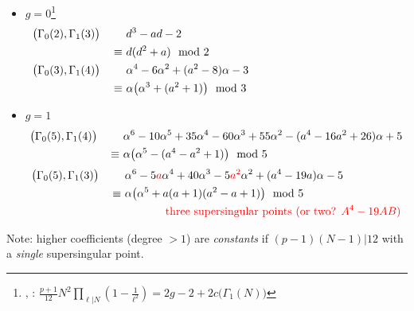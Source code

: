 \documentclass{rs}
\theoremstyle{definition}
\theoremstyle{remark}
\newcommand{\md}{~~{\rm mod}~}
\newcommand{\A}{\alpha}
\newcommand{\G}{\Gamma}
\renewcommand{\=}{\approx}
\renewcommand{\-}{\sim}
\newcommand{\rd}[1]{{\textcolor{red}{#1}}}
\numberwithin{equation}{section}
\begin{document}
\begin{itemize}
 \item $g = 0$\footnote{\cite[Theorem 10.13.12]{KM}, \cite[Section 3.8]{MF}: $\frac{p + 1}{12} N^2 \prod_{\ell | N} \left( 1 - \frac{1}{\ell^2} \right) = 2 g - 2 + 2 c\big(\G_1(N)\big)$} 
 \[
  \begin{split}
   \big(\G_0(2),\G_1(3)\big) \qquad & ~ d^3 - a d - 2 \hskip 6.9cm \\
                             \equiv & ~ d (d^2 + a) \md 2 \\
   \big(\G_0(3),\G_1(4)\big) \qquad & ~ \A^4 - 6 \A^2 + (a^2 - 8) \A - 3 \\
                             \equiv & ~ \A \big(\A^3 + (a^2 + 1)\big) \md 3 
  \end{split}
 \]

 \item $g = 1$ 
 \begin{equation}
  \label{w5}
  \begin{split}
   \big(\G_0(5),\G_1(4)\big) \qquad & ~ \A^6 - 10 \A^5 + 35 \A^4 - 60 \A^3 + 55 \A^2 - (a^4 - 16 a^2 + 26) \A + 5 \\
                             \equiv & ~ \A \big(\A^5 - (a^4 - a^2 + 1)\big) \md 5 
  \end{split}
 \end{equation}
 \[
  \begin{split}
   \big(\G_0(5),\G_1(3)\big) \qquad & ~ \A^6 - 5 \rd{a} \A^4 + 40 \A^3 - 5 \rd{a^2} \A^2 + (a^4 - 19 a) \A - 5 \hskip 1.4cm \\
                             \equiv & ~ \A \big(\A^5 + a (a + 1) (a^2 - a + 1)\big) \md 5 \\
                                    & \hskip 1.4cm \rd{\text{three supersingular points (or two?  $A^4 - 19 A B$)}} 
  \end{split}
 \]
\end{itemize}

Note: higher coefficients (degree $>1$) are {\em constants} if $(p - 1) (N - 1) | 12$ with a {\em single} supersingular point.  
\end{document}
